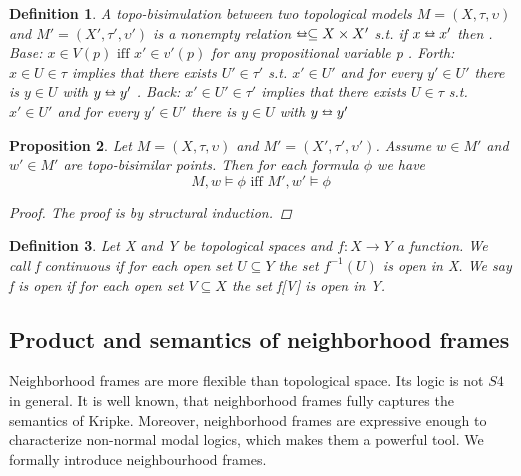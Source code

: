 \documentclass[12pt, a4paper]{scrartcl}
\newtheorem{definition}{Definition}[subsection]
\newtheorem{proposition}[definition]{Proposition}
\begin{document}
\begin{definition}
    A topo-bisimulation between two topological models $M = (X,\tau, \upsilon)$ and $M' = (X', \tau', \upsilon')$ is a nonempty relation $\leftrightarroweq \subseteq X \times X'$ s.t. if $x \leftrightarroweq x'$ then \newline 
    . Base: $x \in V(p) \mbox{ iff } x' \in v'(p)$ for any propositional variable p . Forth: $x \in U \in \tau$ implies that there exists $U' \in \tau'$ s.t. $x' \in U'$ and for every $y' \in U'$ there is $y \in U$ with $y \leftrightarroweq y'$ . Back: $x' \in U' \in \tau'$ implies that there exists $U \in \tau$ s.t. $x' \in U'$ and for every $y' \in U'$ there is $y \in U$ with $y \leftrightarroweq y'$

\end{definition}

\begin{proposition}
    Let $M = (X,\tau, \upsilon)$ and $M' = (X', \tau', \upsilon')$. Assume $w \in M'$ and $w' \in M'$ are topo-bisimilar points.
    Then for each formula $\phi$ we have 
    $$M,w \vDash \phi \mbox{ iff } M', w' \vDash \phi$$
    \begin{proof}
            The proof is by structural induction.
    \end{proof}

\end{proposition}


\begin{definition}
    Let X and Y be topological spaces and $f : X \rightarrow Y$ a function.
    We call f continuous if for each open set $U \subseteq Y$ the set $f^{-1}(U)$ is open in X. We say f 
    is open if for each open set $V \subseteq X$ the set f[V] is open in Y.
        
\end{definition}

\subsection{Product and semantics of neighborhood frames}
Neighborhood frames are more flexible than topological space. Its logic is not $S4$ in general. 
It is well known, that neighborhood frames fully captures the semantics of Kripke. Moreover, neighborhood frames are expressive enough to characterize non-normal modal logics, which makes them a powerful tool.
We formally introduce neighbourhood frames.
\end{document}
